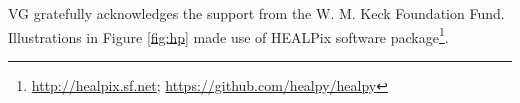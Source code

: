 \acknowledgements

VG gratefully acknowledges the support from the W. M. Keck Foundation Fund. Illustrations in Figure \ref{fig:hp} made use of HEALPix \cite{2005ApJ...622..759G} software package\footnote{\url{ http://healpix.sf.net}; \url{https://github.com/healpy/healpy}}.